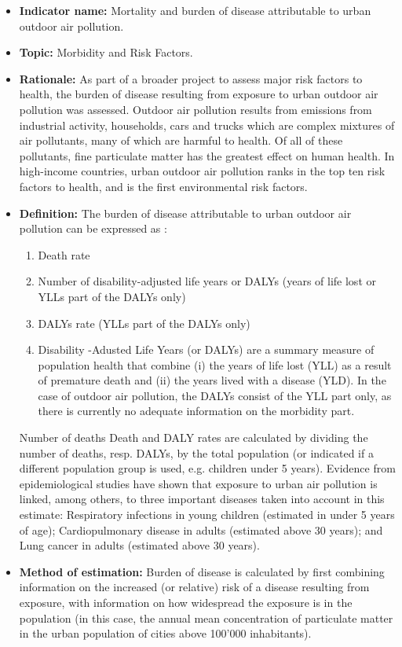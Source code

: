 \documentclass[a4paper,12pt]{article}
\begin{document}
\begin{itemize}
\item \textbf{Indicator name: }Mortality and burden of disease attributable to urban outdoor air pollution.
\item \textbf{Topic:} Morbidity and Risk Factors.
\item \textbf{Rationale:} As part of a broader project to assess major risk factors to health, the burden of disease resulting from exposure to urban outdoor air pollution was assessed. Outdoor air pollution results from emissions from industrial activity, households, cars and trucks which are complex mixtures of air pollutants, many of which are harmful to health. Of all of these pollutants, fine particulate matter has the greatest effect on human health. In high-income countries, urban outdoor air pollution ranks in the top ten risk factors to health, and is the first environmental risk factors.
\item \textbf{Definition:} The burden of disease attributable to urban outdoor air pollution can be expressed as :
\begin{enumerate}
\item Death rate
\item Number of disability-adjusted life years or DALYs (years of life lost or YLLs part of the DALYs only)
\item DALYs rate (YLLs part of the DALYs only)
\item Disability -Adusted Life Years (or DALYs) are a summary measure of population health that combine (i) the years of life lost (YLL) as a result of premature death and (ii) the years lived  with a disease (YLD). In the case of outdoor air pollution, the DALYs consist of the YLL part only, as there is currently no adequate information on the morbidity part.
\end{enumerate}Number of deaths
Death and DALY rates are calculated by dividing the number of deaths, resp. DALYs, by the total population (or indicated if a different population group is used, e.g. children under 5 years).
Evidence from epidemiological studies have shown that exposure to urban air pollution is linked, among others, to three important diseases taken into account in this estimate: Respiratory infections in young children (estimated in under 5 years of age); Cardiopulmonary disease in adults (estimated above 30 years); and Lung  cancer in adults (estimated above 30 years).
\item \textbf{Method of estimation:} Burden of disease is calculated by first combining information on the increased (or relative) risk of a disease resulting from exposure, with information on how widespread the exposure is in the population (in this case,  the annual mean concentration of particulate matter in the urban population of cities above 100'000 inhabitants).

\end{itemize}
\end{document}
